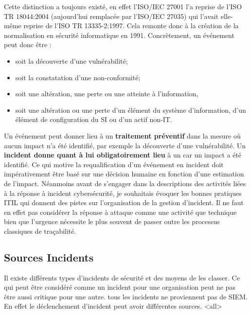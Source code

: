Cette distinction a toujours existé, en effet l'ISO/IEC 27001 l'a reprise de l'ISO TR 18044:2004 (aujourd'hui remplacée par l'ISO/IEC 27035) qui l'avait elle-même reprise de l'ISO TR 13335-2:1997. Cela remonte donc à la création de la normalisation en sécurité informatique en 1991.
Concrètement, un événement peut donc être :
\begin{itemize}
  \item soit la découverte d’une vulnérabilité;
  \item  soit la constatation d’une non-conformité;
  \item soit une altération, une perte ou une atteinte à l’information,
  \item   soit une altération ou une perte d’un élément du système d’information, d’un élément de configuration du SI ou d’un actif non-IT.
\end{itemize}

Un événement peut donner lieu à un \textbf{traitement préventif} dans la mesure où aucun impact n'a été identifié, par exemple la découverte d’une vulnérabilité.
Un \textbf{incident donne quant à lui obligatoirement lieu} à un car un impact a été identifié.
Ce qui motive la requalification d’un événement en incident doit impérativement être basé sur une décision humaine en fonction d'une estimation de l'impact.
Néanmoins avant de s'engager dans la descriptions des activités liées à la réponse à incident cybersécurité, je souhaitais évoquer les bonnes pratiques ITIL qui donnent des pistes sur l'organisation de la gestion d'incident. Il ne faut en effet pas considérer la réponse à attaque comme une activité que technique bien que l'urgence nécessite le plus souvent de passer outre les processus classiques de traçabilité.

\subsection{Sources Incidents}

Il existe différents types d'incidents de sécurité et des moyens de les classer. Ce qui peut être considéré comme un incident pour une organisation peut ne pas être aussi critique pour une autre. tous les incidents ne proviennent pas de SIEM. En effet le déclenchement d'incident peut avoir différentes sources.
\mode<all>{}


